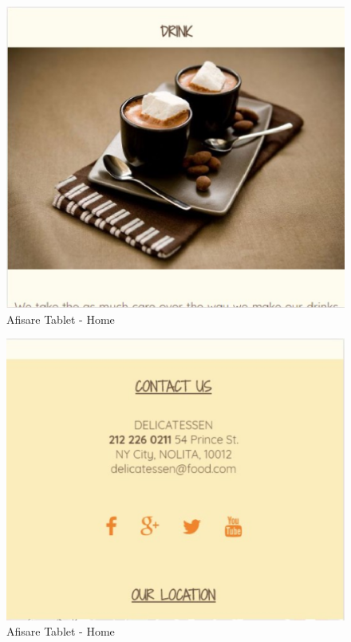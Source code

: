 \documentclass[11pt]{article}
\begin{document}
\begin{figure}[h]
\includegraphics{images/127.eps}
\caption{Afisare Tablet - Home}
\end{figure}

\begin{figure}[h]
\includegraphics{images/128.eps}
\caption{Afisare Tablet - Home}
\end{figure}
\end{document}
